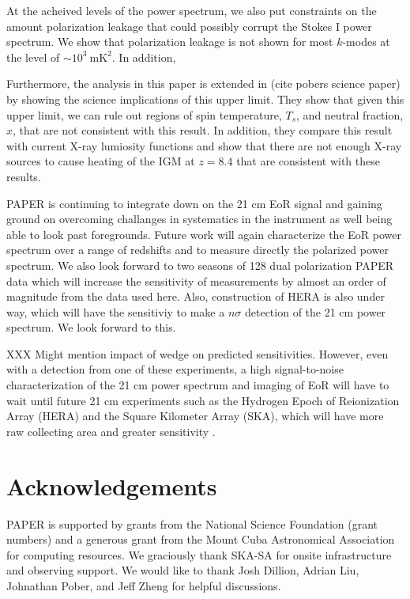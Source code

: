 \documentclass[twocolumn,numberedappendix]{emulateapj} \shorttitle{PSA64}
\begin{document}
At the acheived levels of the power spectrum, we also put constraints on the
amount polarization leakage that could possibly corrupt the Stokes I power
spectrum. We show that polarization leakage is not shown for most $k$-modes at
the level of $\sim10^{3}\ \text{mK}^{2}$. In addition, 

Furthermore, the analysis in this paper is extended in (cite pobers science
paper) by showing the science implications of this upper limit. They show that
given this upper limit, we can rule out regions of spin temperature, $T_{s}$,
and neutral fraction, $x$, that are not consistent with this result. In
addition, they compare this result with current X-ray lumiosity functions and
show that there are not enough X-ray sources to cause heating of the IGM at
$z=8.4$ that are consistent with these results.

PAPER is continuing to integrate down on the 21 cm EoR signal and gaining ground
on overcoming challanges in systematics in the instrument as well being able to
look past foregrounds. Future work will again characterize the EoR power
spectrum over a range of redshifts and to measure directly the polarized power
spectrum. We also look forward to two seasons of 128 dual polarization PAPER
data which will increase the sensitivity of measurements by almost an order of
magnitude from the data used here. Also, construction of HERA is also under way,
which will have the sensitiviy to make a $n\sigma$ detection of the 21 cm power
spectrum. We look forward to this.

XXX Might mention impact of wedge on predicted sensitivities.
However, even with a detection from one of these experiments, a high signal-to-noise characterization of the 21 cm power spectrum and imaging of EoR will have to
wait until future 21 cm experiments such as the Hydrogen Epoch of Reionization
Array (HERA) and the Square Kilometer Array (SKA), which will have more raw
collecting area and greater sensitivity \citep{pober_et_al2014}.

\section{Acknowledgements} 
PAPER is supported by grants from the  National Science Foundation (grant
numbers) and a generous grant from the Mount Cuba Astronomical Association
for computing resources.  We graciously thank SKA-SA for onsite infrastructure
and observing support. We would like to thank Josh Dillion, Adrian Liu,
Johnathan Pober, and Jeff Zheng for helpful discussions.



\end{document}
